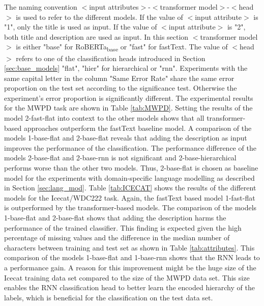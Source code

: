 \documentclass[11pt,dvipdfm]{article}
\begin{document}
The naming convention $<$input attributes$>$-$<$transformer model$>$-$<$head$>$ is used to refer to the different models.
If the value of $<$input attribute$>$ is "1", only the title is used as input.
If the value of $<$input attribute$>$ is "2", both title and description are used as input.
In this section $<$transformer model$>$ is either "base" for RoBERTa\textsubscript{base} or "fast" for fastText.
The value of $<$head$>$ refers to one of the classification heads introduced in Section \ref{sec:base_models} "flat", "hier" for hierarchical or "rnn".
Experiments with the same capital letter in the column "Same Error Rate" share the same error proportion on the test set according to the significance test.
Otherwise the experiment's error proportion is significantly different.
The experimental results for the \ac{MWPD} task are shown in Table \ref{tab:MWPD}.
Setting the results of the model 2-fast-flat into context to the other models shows that all transformer-based approaches outperform the fastText baseline model.
A comparison of the models 1-base-flat and 2-base-flat reveals that adding the description as input improves the performance of the classification.
The performance difference of the models 2-base-flat and 2-base-rnn is not significant and 2-base-hierarchical performs worse than the other two models.
Thus, 2-base-flat is chosen as baseline model for the experiments with domain-specific language modelling as described in Section \ref{sec:lang_mod}.
Table \ref{tab:ICECAT} shows the results of the different models for the Icecat/WDC222 task.
Again, the fastText based model 1-fast-flat is outperformed by the transformer-based models.
The comparison of the models 1-base-flat and 2-base-flat shows that adding the description harms the performance of the trained classifier.
This finding is expected given the high percentage of missing values and the difference in the median number of characters between training and test set as shown in Table \ref{tab:attributes}.
This comparison of the models 1-base-flat and 1-base-rnn shows that the \ac{RNN} leads to a performance gain.
A reason for this improvement might be the huge size of the Icecat training data set compared to the size of the \ac{MWPD} data set.
This size enables the \ac{RNN} classification head to better learn the encoded hierarchy of the labels, which is beneficial for the classification on the test data set.
\end{document}
